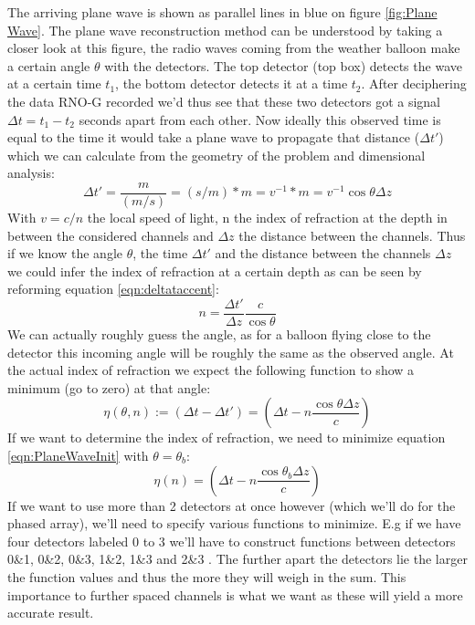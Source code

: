 The arriving plane wave is shown as parallel lines in blue on figure \ref{fig:Plane Wave}. The
plane wave reconstruction method can be understood by taking a closer look at this figure, 
the radio waves coming from the weather balloon make a certain angle $\theta$ with the detectors. The top detector (top box)
detects the wave at a certain time $t_1$, the bottom detector detects it at a
time $t_2$. After deciphering the data RNO-G recorded we'd thus see that these
two detectors got a signal $\Delta t = t_1 - t_2$ seconds apart from each other.
Now ideally this observed time is equal to the time it would take a plane
wave to propagate that distance ($\Delta t'$) which we can calculate from the geometry of
the problem and dimensional analysis:
\begin{equation}
	\Delta t' = \frac{m}{(m/s)} = (s/m)*m = v^{-1} * m = v^{-1} \cos\theta \Delta z
	\label{eqn:deltataccent}
\end{equation}
With $v = c/n$ the local speed of light, n the index of refraction at the depth in between
the considered channels and $\Delta z$ the distance between the channels. 
Thus if we know the angle $\theta$, the time $\Delta t'$ and the distance between the channels $\Delta z$
we could infer the index of refraction at a certain depth as can be seen by reforming equation \ref{eqn:deltataccent}:
\begin{equation}
	n = \frac{\Delta t'}{\Delta z} \frac{c}{\cos\theta}
\end{equation}
We can actually roughly guess the angle, as for a balloon flying close to the
detector this incoming angle will be roughly the same as the observed angle.
At the actual index of refraction we expect the following function to show a 
minimum (go to zero) at that angle:
\begin{equation}
	\eta(\theta,n) := (\Delta t - \Delta t') = \left(\Delta t
	- n\frac{\cos\theta \Delta z}{c}\right)
  	\label{eqn:PlaneWaveInit}
\end{equation}
If we want to determine the index of refraction, 
we need to minimize equation \ref{eqn:PlaneWaveInit} with $\theta=\theta_b$:
\begin{equation}
	\eta(n) = \left(\Delta t
	- n\frac{\cos\theta_b \Delta z}{c}\right)
  	\label{eqn:eta}
\end{equation}
If we want to use more than 2 detectors at once however (which we'll
do for the phased array), we'll need to specify various functions to
minimize.  E.g if we have four detectors labeled 0 to 3 we'll have
to construct functions between detectors 0\&1, 0\&2, 0\&3, 1\&2,
1\&3 and 2\&3 . The further apart the detectors lie the larger the
function values and thus the more they will weigh in the sum. This importance to
further spaced channels is what we want as these will yield a more
accurate result. 

